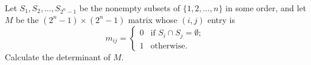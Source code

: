 Let $S_1, S_2, \dots, S_{2^n-1}$ be the nonempty subsets of $\{1,2,\dots,n\}$ in some order, and let
$M$ be the $(2^n-1) \times (2^n-1)$ matrix whose $(i,j)$ entry is
\[
m_{ij} = \begin{cases} 0 & \mbox{if }S_i \cap S_j = \emptyset; \\
1 & \mbox{otherwise.}
\end{cases}
\]
Calculate the determinant of $M$.
